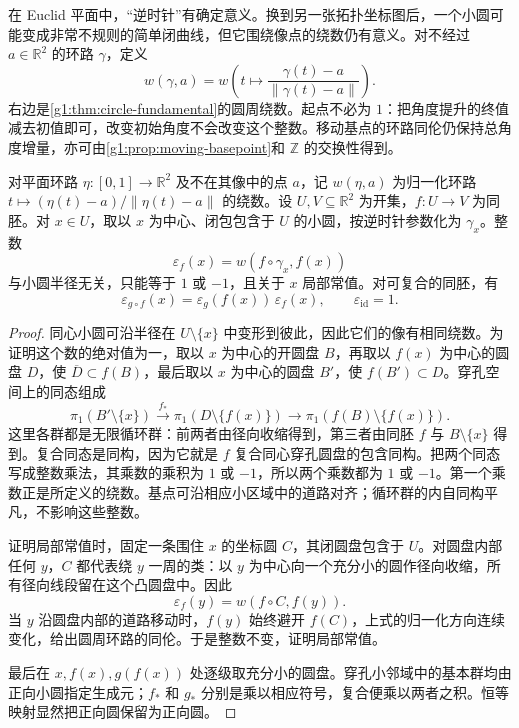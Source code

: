 在 Euclid 平面中，“逆时针”有确定意义。换到另一张拓扑坐标图后，一个小圆可能变成非常不规则的简单闭曲线，但它围绕像点的绕数仍有意义。对不经过 \(a\in\mathbb R^2\) 的环路 \(\gamma\)，定义
\[
	w(\gamma,a)=w\left(t\longmapsto
	\frac{\gamma(t)-a}{\lVert\gamma(t)-a\rVert}\right).
\]
右边是\cref{g1:thm:circle-fundamental}的圆周绕数。起点不必为 \(1\)：把角度提升的终值减去初值即可，改变初始角度不会改变这个整数。移动基点的环路同伦仍保持总角度增量，亦可由\cref{g1:prop:moving-basepoint}和 \(\mathbb Z\) 的交换性得到。

\begin{proposition}\label{g1:prop:orientation-local-sign}
	对平面环路 \(\eta:[0,1]\to\mathbb R^2\) 及不在其像中的点 \(a\)，记 \(w(\eta,a)\) 为归一化环路 \(t\mapsto(\eta(t)-a)/\lVert\eta(t)-a\rVert\) 的绕数。设 \(U,V\subseteq\mathbb R^2\) 为开集，\(f:U\to V\) 为同胚。对 \(x\in U\)，取以 \(x\) 为中心、闭包包含于 \(U\) 的小圆，按逆时针参数化为 \(\gamma_x\)。整数
	\[
		\varepsilon_f(x)=w(f\circ\gamma_x,f(x))
	\]
	与小圆半径无关，只能等于 \(1\) 或 \(-1\)，且关于 \(x\) 局部常值。对可复合的同胚，有
	\[
		\varepsilon_{g\circ f}(x)=\varepsilon_g(f(x))\,\varepsilon_f(x),
		\qquad \varepsilon_{\operatorname{id}}=1.
	\]
\end{proposition}
\begin{proof}
	同心小圆可沿半径在 \(U\setminus\{x\}\) 中变形到彼此，因此它们的像有相同绕数。为证明这个数的绝对值为一，取以 \(x\) 为中心的开圆盘 \(B\)，再取以 \(f(x)\) 为中心的圆盘 \(D\)，使 \(\overline D\subset f(B)\)，最后取以 \(x\) 为中心的圆盘 \(B'\)，使 \(f(B')\subset D\)。穿孔空间上的同态组成
	\[
		\pi_1(B'\setminus\{x\})\xrightarrow{\,f_*\,}
		\pi_1(D\setminus\{f(x)\})\longrightarrow
		\pi_1(f(B)\setminus\{f(x)\}).
	\]
	这里各群都是无限循环群：前两者由径向收缩得到，第三者由同胚 \(f\) 与 \(B\setminus\{x\}\) 得到。复合同态是同构，因为它就是 \(f\) 复合同心穿孔圆盘的包含同构。把两个同态写成整数乘法，其乘数的乘积为 \(1\) 或 \(-1\)，所以两个乘数都为 \(1\) 或 \(-1\)。第一个乘数正是所定义的绕数。基点可沿相应小区域中的道路对齐；循环群的内自同构平凡，不影响这些整数。

	证明局部常值时，固定一条围住 \(x\) 的坐标圆 \(C\)，其闭圆盘包含于 \(U\)。对圆盘内部任何 \(y\)，\(C\) 都代表绕 \(y\) 一周的类：以 \(y\) 为中心向一个充分小的圆作径向收缩，所有径向线段留在这个凸圆盘中。因此
	\[
		\varepsilon_f(y)=w(f\circ C,f(y)).
	\]
	当 \(y\) 沿圆盘内部的道路移动时，\(f(y)\) 始终避开 \(f(C)\)，上式的归一化方向连续变化，给出圆周环路的同伦。于是整数不变，证明局部常值。

	最后在 \(x,f(x),g(f(x))\) 处逐级取充分小的圆盘。穿孔小邻域中的基本群均由正向小圆指定生成元；\(f_*\) 和 \(g_*\) 分别是乘以相应符号，复合便乘以两者之积。恒等映射显然把正向圆保留为正向圆。
\end{proof}

